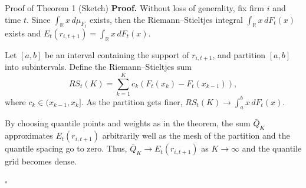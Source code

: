 \documentclass[aspectratio=169]{beamer}
\begin{document}
\begin{frame}{Proof of Theorem 1 (Sketch)}
\textbf{Proof.} Without loss of generality, fix firm $i$ and time $t$. Since $\int_{\mathbb{R}} x\, d\mu_{F_t}$ exists, then the Riemann–Stieltjes integral $\int_{\mathbb{R}} x\, dF_t(x)$ exists and $E_t(r_{i,t+1}) = \int_{\mathbb{R}} x\, dF_t(x)$.

Let $[a, b]$ be an interval containing the support of $r_{i,t+1}$, and partition $[a, b]$ into subintervals. Define the Riemann–Stieltjes sum
\[
RS_t(K) = \sum_{k=1}^K c_k (F_t(x_k) - F_t(x_{k-1})),
\]
where $c_k \in (x_{k-1}, x_k]$. As the partition gets finer, $RS_t(K) \to \int_a^b x\, dF_t(x)$.

By choosing quantile points and weights as in the theorem, the sum $\bar{Q}_K$ approximates $E_t(r_{i,t+1})$ arbitrarily well as the mesh of the partition and the quantile spacing go to zero. Thus, $\bar{Q}_K \to E_t(r_{i,t+1})$ as $K \to \infty$ and the quantile grid becomes dense.

\hfill$\square$
\end{frame}


\end{document}
